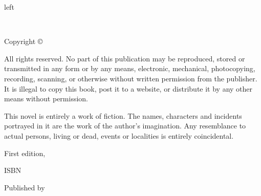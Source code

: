 
\begin{narrowsection}{130mm}{left}
{\small
\setlength{\parindent}{0em}\setlength{\parskip}{1em}

~

\vfill

Copyright \copyright{} \copyrightyear{} \authorname

All rights reserved. No part of this publication may be reproduced, stored or transmitted in any form or by any means, electronic, mechanical, photocopying, recording, scanning, or otherwise without written permission from the publisher. It is illegal to copy this book, post it to a website, or distribute it by any other means without permission.

This novel is entirely a work of fiction. The names, characters and incidents portrayed in it are the work of the author’s imagination. Any resemblance to actual persons, living or dead, events or localities is entirely coincidental.

First edition, \editionyear{}

ISBN \isbn{}  %

Published by \publisher{}
}
\end{narrowsection}
